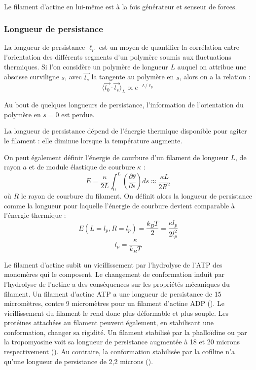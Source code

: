 Le filament d'actine en lui-même est à la fois générateur et senseur de forces. 

 \subsubsection{Longueur de persistance}
La longueur de persistance $\ell_p$ est un moyen de quantifier la corrélation entre l'orientation des différents segments d'un polymère soumis aux fluctuations thermiques. Si l'on considère un polymère de longueur $L$ auquel on attribue une abscisse curviligne $s$, avec $\vec{t_s}$ la tangente au polymère en $s$, alors on a la relation : 
$$ \langle \vec{t_0}\cdot \vec{t_s} \rangle_L \propto e^{-L/\ell_p}$$

Au bout de quelques longueurs de persistance, l'information de l'orientation du polymère en $s=0$ est perdue. 

La longueur de persistance dépend de l'énergie thermique disponible pour agiter le filament : elle diminue lorsque la température augmente. 

On peut également définir l'énergie de courbure d'un filament de longueur $L$, de rayon $a$ et de module élastique de courbure $\kappa$ : 
$$ E= \frac{\kappa}{2L} \int_0^L \left( \frac{\partial \theta}{\partial s} \right) ds \approx \frac{\kappa L}{2R^2}$$
 où $R$ le rayon de courbure du filament.  
 On définit alors la longueur de persistance comme la longueur pour laquelle l'énergie de courbure devient comparable à l'énergie thermique : 
 $$ E (L=l_p,R=l_p) = \frac{k_B T}{2} = \frac{\kappa l_p}{2 l_p^2}$$ 
 $$ l_p = \frac{\kappa}{k_B T}$$
 
 
Le filament d'actine subit un vieillissement par l'hydrolyse de l'ATP des monomères qui le composent. Le changement de conformation induit par l'hydrolyse de l'actine a des conséquences sur les propriétés mécaniques du filament. 
Un filament d'actine ATP a une longueur de persistance de 15 micromètres, contre 9 micromètres pour un filament d'actine ADP (\cite{isambert_flexibility_1995}). Le vieillissement du filament le rend donc plus déformable et plus souple. 
Les protéines attachées au filament peuvent également, en stabilisant une conformation, changer sa rigidité. Un filament stabilisé par la phalloïdine ou par la tropomyosine voit sa longueur de persistance augmentée à 18 et 20 microns respectivement (\cite{isambert_flexibility_1995}). Au contraire, la conformation stabilisée par la cofiline n'a qu'une longueur de persistance de 2,2 microns (\cite{mccullough_cofilin_2008}). 

